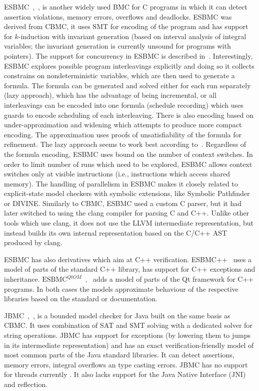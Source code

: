 ESBMC~\cite{Gadelha2018},~\cite{Gadelha2019}, is another widely used BMC for C
programs in which it can detect assertion violations, memory errors, overflows and  deadlocks.
ESBMC was derived from CBMC, it uses SMT for encoding of the program and has
support for $k$-induction with invariant generation (based on interval analysis
of integral variables; the invariant generation is currently unsound for
programs with pointers).
The support for concurrency in ESBMC is described in~\cite{Cordeiro2011}.
Interestingly, ESBMC explores possible program interleavings explicitly and
doing so it collects constrains on nondeterministic variables, which are then
used to generate a formula.
The formula can be generated and solved either for each run separately (lazy
approach), which has the advantage of being incremental, or all interleavings
can be encoded into one formula (schedule recording) which uses guards to
encode scheduling of each interleaving.
There is also encoding based on under-approximation and widening which attempts
to produce more compact encoding.
The approximation uses proofs of unsatisfiability of the formula for refinement.
The lazy approach seems to work best according to~\cite{Cordeiro2011}.
Regardless of the formula encoding, ESBMC uses bound on the number of context
switches.
In order to limit number of runs which need to be explored, ESBMC allows
context switches only at visible instructions (i.e., instructions which access
shared memory).
The handling of parallelism in ESBMC makes it closely related to explicit-state
model checkers with symbolic extensions, like Symbolic Pathfinder or DIVINE.
Similarly to CBMC, ESBMC used a custom C parser, but it had later switched to
using the clang compiler for parsing C and C++.
Unlike other tools which use clang, it does not use the LLVM intermediate
representation, but instead builds its own internal representation based on the
C/C++ AST produced by clang.

ESBMC has also derivatives which aim at C++ verification.
ESBMC++~\cite{Ramalho2013} uses a model of parts of the standard C++ library,
has support for C++ exceptions and inheritance.
$\text{ESBMC}^{\textit{Qt}OM}$~\cite{Sousa2015},~\cite{Garcia2016} adds a model
of parts of the Qt framework for C++ programs.
In both cases the models approximate behaviour of the respective libraries
based on the standard or documentation.

JBMC~\cite{Cordeiro2019},~\cite{Cordeiro2018}, is a bounded model checker for
Java built on the same basis as CBMC.
It uses combination of SAT and SMT solving with a dedicated solver for string
operations.
JBMC has support for exceptions (by lowering them to jumps in its intermediate
representation) and has an exact verification-friendly model of most common
parts of the Java standard libraries.
It can detect assertions, memory errors, integral overflows an type casting
errors.
JBMC has no support for threads currently .
It also lacks support for the Java Native Interface (JNI) and reflection.

